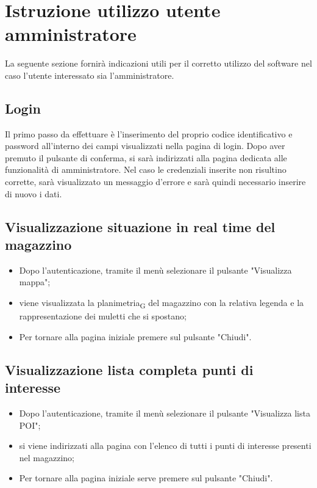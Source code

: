 \section{Istruzione utilizzo utente amministratore}

La seguente sezione fornirà indicazioni utili per il corretto utilizzo del software nel caso l'utente interessato sia l'amministratore.

\subsection{Login}
Il primo passo da effettuare è l'inserimento del proprio codice identificativo e password all'interno dei campi visualizzati nella pagina di login. Dopo aver premuto il pulsante di conferma, si sarà indirizzati alla pagina dedicata alle funzionalità di amministratore. Nel caso le credenziali inserite non risultino corrette, sarà visualizzato un messaggio d'errore e sarà quindi necessario inserire di nuovo i dati.

\subsection{Visualizzazione situazione in real time del magazzino}
\begin{itemize}
    \item Dopo l'autenticazione, tramite il menù selezionare il pulsante "Visualizza mappa";
    \item viene visualizzata la planimetria\textsubscript{G} del magazzino con la relativa legenda e la rappresentazione dei muletti che si spostano;
    \item Per tornare alla pagina iniziale premere sul pulsante "Chiudi".
\end{itemize}
\subsection{Visualizzazione lista completa punti di interesse}
\begin{itemize}
    \item Dopo l'autenticazione, tramite il menù selezionare il pulsante "Visualizza lista POI";
    \item si viene indirizzati alla pagina con l'elenco di tutti i punti di interesse presenti nel magazzino;
    \item Per tornare alla pagina iniziale serve premere sul pulsante "Chiudi".
\end{itemize}
